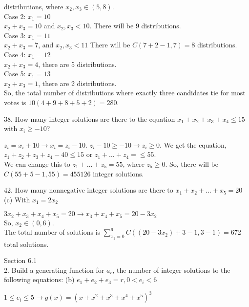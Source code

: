 \documentclass[12pt]{article}
\begin{document}
\begin{enumerate}[label=(\alph*)]
\begin{solution}
        distributions, where $x_2, x_3 \in (5, 8)$. \\
        Case 2: $x_1 = 10$\\ 
        $x_2 + x_3 = 10$ and $x_2, x_3 < 10$. There will be 9 
        distributions. \\
        Case 3: $x_1 = 11$\\
        $x_2 + x_3 = 7$, and $x_2, x_3 < 11$ There will be $C(7+2-1, 7)=8$ 
        distributions.\\ 
        Case 4: $x_1 = 12$\\
        $x_2 + x_3 = 4$, there are 5 distributions.\\
        Case 5: $x_1 = 13$\\
        $x_2 + x_3 = 1$, there are 2 distributions.\\
        So, the total number of distributions where exactly three 
        candidates tie for most votes is $10(4 + 9 + 8 + 5 + 2)=280$.
    \end{solution}
\end{enumerate}
38. How many integer solutions are there to the equation $x_1 + x_2 + x_3 
+ x_4 \le 15$
with $x_i \ge -10$?
\begin{solution}
    $z_i = x_i + 10 \rightarrow x_i = z_i - 10$. $z_i - 10 \ge -10 
    \rightarrow z_i \ge0$.
    We get the equation, 
    $z_1 + z_2 + z_3 + z_4 - 40 \le 15$ or 
    $z_1 +\dots + z_4 =\le 55$. \\
    We can change this to $z_1 + \dots + z_5 = 55$, where $z_5\ge0$. 
    So, there will be $C(55+5-1, 55) = 455126$ integer solutions. 
\end{solution}
42. How many nonnegative integer solutions are there to 
$x_1 + x_2 + \dots + x_5 = 20$\\
(c) With $x_1=2x_2$
\begin{solution}
    $3x_2 + x_3 + x_4 + x_5 = 20 \rightarrow x_3 + x_4 + x_5 = 20-3x_2$\\
    So, $x_2 \in(0, 6)$. \\
    The total number of solutions is 
    $\sum_{x_2=0}^{6} C((20-3x_2) + 3 - 1, 3-1) = 672$ total solutions. 
\end{solution}
Section 6.1\\
2. Build a generating function for $a_r$, the number of integer solutions 
to the following equations:
(b) $e_1 + e_2 + e_3 = r, 0 < e_i < 6$
\begin{solution}
    $1 \le e_i \le 5 \rightarrow g(x)=(x+x^2+x^3+x^4+x^5)^3$
\end{solution}
\end{document}
